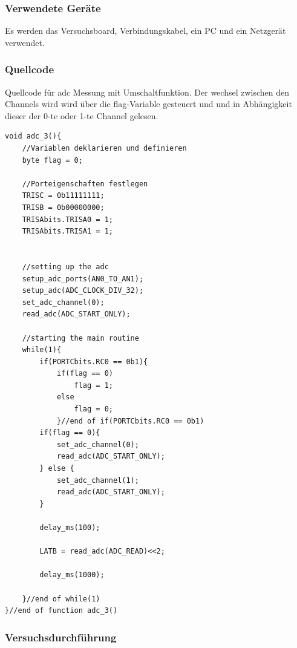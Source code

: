 \documentclass[12pt,a4paper]{article}
\begin{document}
\subsubsection*{Verwendete Geräte}

Es werden das Versuchsboard, Verbindungskabel, ein PC und ein Netzgerät verwendet.

\subsubsection*{Quellcode}

Quellcode für adc Messung mit Umschaltfunktion. Der wechsel zwischen den Channels wird wird über die flag-Variable gesteuert und und in Abhängigkeit dieser der 0-te oder 1-te Channel gelesen.

\lstset{language=C, basicstyle=\tiny}
\begin{lstlisting}[caption = {acd mit Umschaltfunktion}, label=lst:g_15,captionpos=b]
void adc_3(){
	//Variablen deklarieren und definieren
	byte flag = 0;

	//Porteigenschaften festlegen
	TRISC = 0b11111111;
	TRISB = 0b00000000;
	TRISAbits.TRISA0 = 1;
	TRISAbits.TRISA1 = 1;
	
	
	//setting up the adc
	setup_adc_ports(AN0_TO_AN1);
	setup_adc(ADC_CLOCK_DIV_32);
	set_adc_channel(0);
	read_adc(ADC_START_ONLY);
	
	//starting the main routine
	while(1){
		if(PORTCbits.RC0 == 0b1){
			if(flag == 0)
				flag = 1;
			else
				flag = 0;
			}//end of if(PORTCbits.RC0 == 0b1)
		if(flag == 0){
			set_adc_channel(0);
			read_adc(ADC_START_ONLY);
		} else {
			set_adc_channel(1);
			read_adc(ADC_START_ONLY);			
		}
		
		delay_ms(100);
		
		LATB = read_adc(ADC_READ)<<2;
		
		delay_ms(1000);
				
	}//end of while(1)
}//end of function adc_3()
\end{lstlisting}

\subsubsection*{Versuchsdurchführung}
\end{document}
